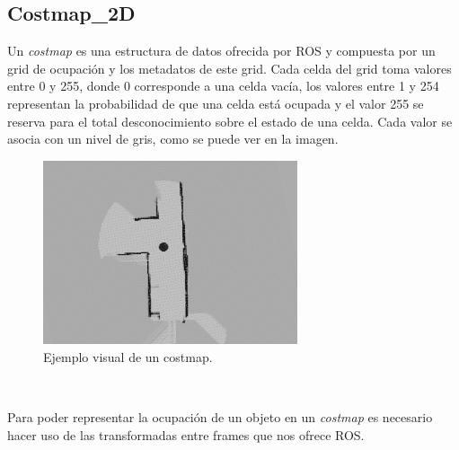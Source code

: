 \subsection{Costmap\_2D}
\label{sec:costmap2d}
Un \textit{costmap} es una estructura de datos ofrecida por ROS y compuesta por un grid de ocupación y los metadatos de este grid. Cada celda del grid toma valores entre 0 y 255, donde 0 corresponde a una celda vacía, los valores entre 1 y 254 representan la probabilidad de que una celda está ocupada y el valor 255 se reserva para el total desconocimiento sobre el estado de una celda. Cada valor se asocia con un nivel de gris, como se puede ver en la imagen.
\begin{figure} [H]
  \begin{center}
    \includegraphics[width=7.5cm]{img/cap3/costmap-ejemplo}
  \end{center}
  \caption{Ejemplo visual de un costmap.}
  \label{fig:costmap-ejemplo}
\end{figure}\

Para poder representar la ocupación de un objeto en un \textit{costmap} es necesario hacer uso de las transformadas entre frames que nos ofrece ROS.

